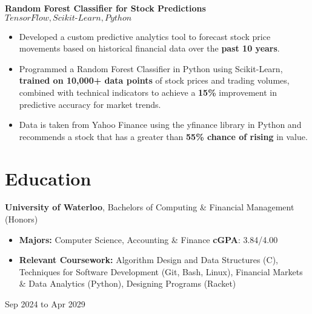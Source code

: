 \documentclass[10pt, letterpaper]{article}
\newenvironment{highlights}{
    \begin{itemize}[
        topsep=0.10 cm,
        parsep=0.10 cm,
        partopsep=0pt,
        itemsep=0pt,
        leftmargin=0.4 cm + 10pt
    ]
}{
    \end{itemize}
} %
\newenvironment{twocolentry}[2][]{
    \onecolentry
    \def\secondColumn{#2}
    \setcolumnwidth{\fill, 2.5 cm}
    \begin{paracol}{2}
}{
    \switchcolumn \raggedleft \secondColumn
    \end{paracol}
    \endonecolentry
} %
\newenvironment{threecolentry}[3][]{
    \onecolentry
    \def\thirdColumn{#3}
    \setcolumnwidth{1 cm, \fill, 2.5 cm}
    \begin{paracol}{3}
    {\raggedright #2} \switchcolumn
}{
    \switchcolumn \raggedleft \thirdColumn
    \end{paracol}
    \endonecolentry
} %
\let\hrefWithoutArrow\href
\renewcommand{\href}[2]{\hrefWithoutArrow{#1}{\ifthenelse{\equal{#2}{}}{ }{#2 }\raisebox{.15ex}{\footnotesize \faExternalLink*}}}
\begin{document}
        \vspace{0.05 cm}

        \begin{twocolentry}{
            \href{https://github.com/akramj13/ai-stock-predictor}{GitHub Link}
        }
            \textbf{Random Forest Classifier for Stock Predictions \hfill $TensorFlow, Scikit\textit{-}Learn, Python$}
            \begin{highlights}
                \item Developed a custom predictive analytics tool to forecast stock price movements based on historical financial data over the \textbf{past 10 years}.
                \item Programmed a Random Forest Classifier in Python using Scikit-Learn, \textbf{trained on 10,000+ data points} of stock prices and trading volumes, combined with technical indicators to achieve a \textbf{15\%} improvement in predictive accuracy for market trends.
                \item Data is taken from Yahoo Finance using the yfinance library in Python and recommends a stock that has a greater than \textbf{55\% chance of rising} in value.
            \end{highlights}
        \end{twocolentry}



    
    \section{Education}



        
        \begin{threecolentry}{\textbf{}}{
            Sep 2024 to Apr 2029
        }
            \textbf{University of Waterloo}, Bachelors of Computing \& Financial Management (Honors)
            \begin{highlights}
                \item \textbf{Majors:} Computer Science, Accounting \& Finance \hfill \textbf{cGPA}: 3.84/4.00
                \item \textbf{Relevant Coursework:} Algorithm Design and Data Structures (C), Techniques for Software Development (Git, Bash, Linux), Financial Markets \& Data Analytics (Python), Designing Programs (Racket)
            \end{highlights}
        \end{threecolentry}


    
\end{document}

